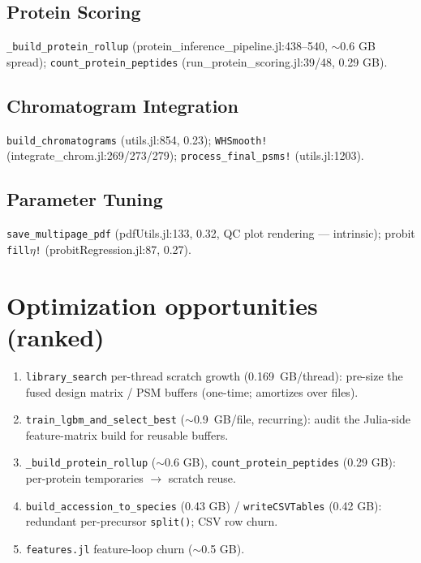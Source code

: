 \documentclass[11pt]{article}
\begin{document}
\subsection*{Protein Scoring}
\texttt{\_build\_protein\_rollup} (protein\_inference\_pipeline.jl:438--540, $\sim$0.6 GB
spread); \texttt{count\_protein\_peptides} (run\_protein\_scoring.jl:39/48, 0.29 GB).
\subsection*{Chromatogram Integration}
\texttt{build\_chromatograms} (utils.jl:854, 0.23); \texttt{WHSmooth!}
(integrate\_chrom.jl:269/273/279); \texttt{process\_final\_psms!} (utils.jl:1203).
\subsection*{Parameter Tuning}
\texttt{save\_multipage\_pdf} (pdfUtils.jl:133, 0.32, QC plot rendering --- intrinsic);
probit \texttt{fill$\eta$!} (probitRegression.jl:87, 0.27).

\section{Optimization opportunities (ranked)}
\begin{enumerate}
  \item \texttt{library\_search} per-thread scratch growth (\SI{0.169}{GB/thread}):
        pre-size the fused design matrix / PSM buffers (one-time; amortizes over files).
  \item \texttt{train\_lgbm\_and\_select\_best} ($\sim$\SI{0.9}{GB/file}, recurring):
        audit the Julia-side feature-matrix build for reusable buffers.
  \item \texttt{\_build\_protein\_rollup} ($\sim$0.6 GB), \texttt{count\_protein\_peptides}
        (0.29 GB): per-protein temporaries $\to$ scratch reuse.
  \item \texttt{build\_accession\_to\_species} (0.43 GB) / \texttt{writeCSVTables} (0.42 GB):
        redundant per-precursor \texttt{split()}; CSV row churn.
  \item \texttt{features.jl} feature-loop churn ($\sim$0.5 GB).
\end{enumerate}
\end{document}
